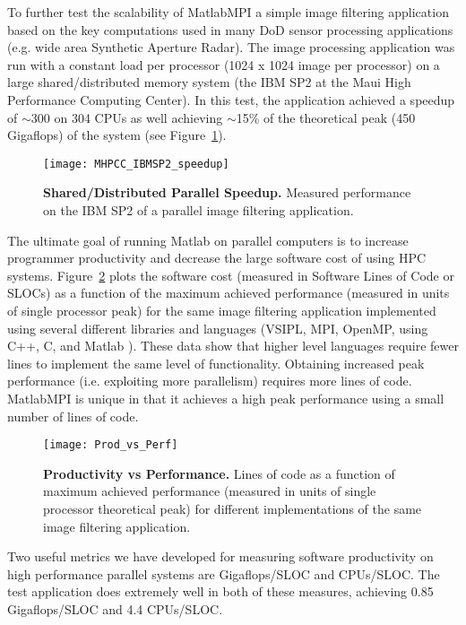 \documentclass[11pt,twocolumn]{article}
\begin{document}
  To further test the scalability of MatlabMPI a simple image filtering
application based on the key
computations used in many DoD sensor processing
applications (e.g. wide area Synthetic Aperture Radar).  The image
processing application was run with a constant load per processor
(1024 x 1024 image per processor) on a large shared/distributed memory
system (the IBM SP2 at the Maui High Performance Computing Center).
In this test, the application achieved a speedup of $\sim$300 on 304
CPUs as well achieving $\sim$15\% of the theoretical peak (450
Gigaflops) of the system (see Figure~\ref{fig:MHPCC_IBMSP2_speedup}).
\begin{figure}[tbh]
\centerline{\texttt{[image: MHPCC\_IBMSP2\_speedup]}}
\caption{ {\bf Shared/Distributed Parallel Speedup.}
Measured performance on the IBM SP2 of a parallel image filtering
application.
}
\label{fig:MHPCC_IBMSP2_speedup}
\end{figure}

  The ultimate goal of running Matlab on parallel computers is to
increase programmer productivity and decrease the large software cost
of using HPC systems.  Figure~\ref{fig:Prod_vs_Perf} plots the
software cost (measured in Software Lines of Code or SLOCs) as a
function of the maximum achieved performance (measured in units of
single processor peak) for the same image filtering application
implemented using several different libraries and languages (VSIPL,
MPI, OpenMP, using C++, C, and Matlab \cite{Kepner2002}).  These data
show that higher level languages require fewer lines to implement the
same level of functionality.  Obtaining increased peak performance
(i.e. exploiting more parallelism) requires more lines of code.
MatlabMPI is unique in that it achieves a high peak performance using
a small number of lines of code.

\begin{figure}[tbh]
\centerline{\texttt{[image: Prod\_vs\_Perf]}}
\caption{ {\bf Productivity vs Performance.}
  Lines of code as a function of maximum achieved performance (measured
in units of single processor theoretical peak) for different
implementations of the same image filtering application.
}
\label{fig:Prod_vs_Perf}
\end{figure}

  Two useful metrics we have developed for measuring software
productivity on high performance parallel systems are Gigaflops/SLOC
and CPUs/SLOC.  The test application does extremely well in both of
these measures, achieving 0.85 Gigaflops/SLOC and 4.4 CPUs/SLOC.
\end{document}
